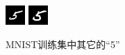 \documentclass[titlepage,UTF8,zihao=-4]{ctexart}
\begin{document}
\begin{figure}[htbp]
    \includegraphics[width=4 cm]{./Images/173.png}
    \includegraphics[width=4 cm]{./Images/175.png}
    \caption{MNIST训练集中其它的“5”}\label{im2}
\end{figure}
\end{document}
